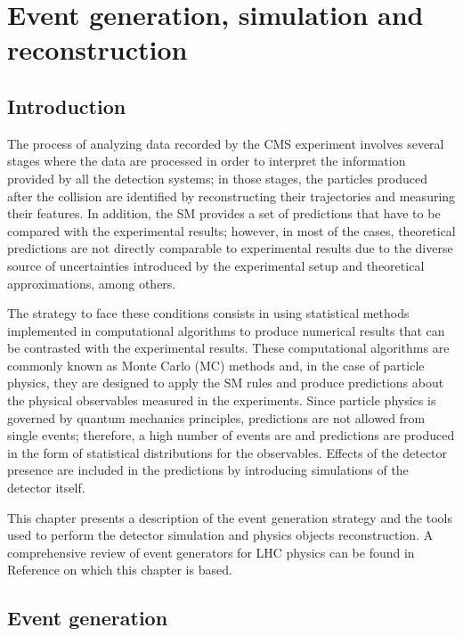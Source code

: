 \chapter{Event generation, simulation and reconstruction}\label{ch:gensimreco}

\section{Introduction}

The process of analyzing data recorded by the CMS experiment involves several stages where the data are processed in order to interpret the information provided by all the detection systems; in those stages, the particles produced after the \pp collision are identified by reconstructing their trajectories and measuring their features. In addition, the SM provides a set of predictions that have to be compared with the experimental results; however, in most of the cases, theoretical predictions are not directly comparable to experimental results due to the diverse source of uncertainties introduced by the experimental setup and theoretical approximations, among others.

The strategy to face these conditions consists in using statistical methods implemented in computational algorithms to produce numerical results that can be contrasted with the experimental results. These computational algorithms are commonly known as Monte Carlo (MC) methods and, in the case of particle physics, they are designed to apply the SM rules and produce predictions about the physical observables measured in the experiments. Since particle physics is governed by quantum mechanics principles, predictions are not allowed from single events; therefore, a high number of events are  and predictions are produced in the form of statistical distributions for the observables. Effects of the detector presence are included in the predictions by introducing simulations of the detector itself.     

This chapter presents a description of the event generation strategy and the tools used to perform the detector simulation and physics objects reconstruction. A comprehensive review of event generators for LHC physics can be found in Reference \cite{gen} on which this chapter is based.  

\section{Event generation}\label{sec:event_generation}

